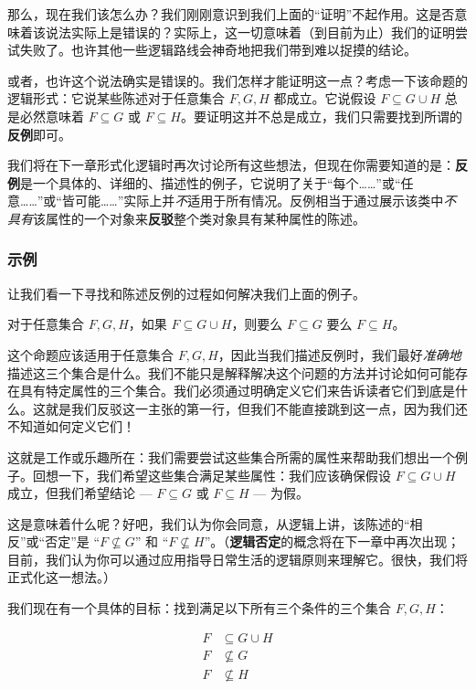 那么，现在我们该怎么办？我们刚刚意识到我们上面的``证明''不起作用。这是否意味着该说法实际上是错误的？实际上，这一切意味着（到目前为止）我们的证明尝试失败了。也许其他一些逻辑路线会神奇地把我们带到难以捉摸的结论。

或者，也许这个说法确实是错误的。我们怎样才能证明这一点？考虑一下该命题的逻辑形式：它说某些陈述对于任意集合 $F,G,H$ 都成立。它说假设 $F \subseteq G \cup H$ 总是必然意味着 $F \subseteq G$ 或 $F \subseteq H$。要证明这并不总是成立，我们只需要找到所谓的\textbf{反例}即可。

我们将在下一章形式化逻辑时再次讨论所有这些想法，但现在你需要知道的是：\textbf{反例}是一个具体的、详细的、描述性的例子，它说明了关于``每个……''或``任意……''或``皆可能……''实际上并\emph{不}适用于所有情况。反例相当于通过展示该类中\emph{不具有}该属性的一个对象来\textbf{反驳}整个类对象具有某种属性的陈述。

\subsubsection*{示例}

让我们看一下寻找和陈述反例的过程如何解决我们上面的例子。\\

\begin{example}
    对于任意集合 $F, G, H$，如果 $F \subseteq G \cup H$，则要么 $F \subseteq G$ 要么 $F \subseteq H$。
\end{example}

这个命题应该适用于任意集合 $F,G,H$，因此当我们描述反例时，我们最好\emph{准确地}描述这三个集合是什么。我们不能只是解释解决这个问题的方法并讨论如何可能存在具有特定属性的三个集合。我们必须通过明确定义它们来告诉读者它们到底是什么。这就是我们反驳这一主张的第一行，但我们不能直接跳到这一点，因为我们还不知道如何定义它们！

这就是工作或乐趣所在：我们需要尝试这些集合所需的属性来帮助我们想出一个例子。回想一下，我们希望这些集合满足某些属性：我们应该确保假设 $F \subseteq G \cup H$ 成立，但我们希望结论 --- $F \subseteq G$ 或 $F \subseteq H$ --- 为假。

这是意味着什么呢？好吧，我们认为你会同意，从逻辑上讲，该陈述的``相反''或``否定''是 ``$F \nsubseteq G$'' 和 ``$F \nsubseteq H$''。（\textbf{逻辑否定}的概念将在下一章中再次出现；目前，我们认为你可以通过应用指导日常生活的逻辑原则来理解它。很快，我们将正式化这一想法。）

我们现在有一个具体的目标：找到满足以下所有三个条件的三个集合 $F,G,H$：

\begin{align*}
    F &\subseteq G \cup H \\
    F &\nsubseteq G \\
    F &\nsubseteq H \\
\end{align*}


